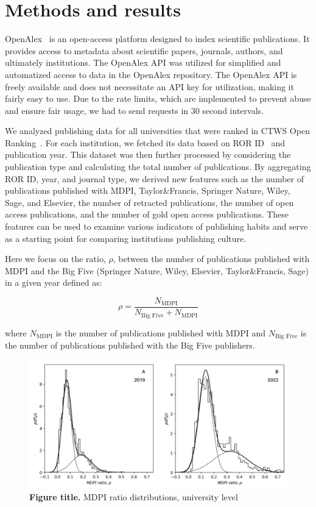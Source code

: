 \documentclass[amsfonts, amssymb, prl, superscriptaddress, notitlepage, twocolumn, nofootinbib]{revtex4-2}
\begin{document}
\section{Methods and results}
OpenAlex~\cite{priem2022openalex} is an open-access platform designed to index scientific publications. It provides access to metadata about scientific papers, journals, authors, and ultimately institutions. The OpenAlex API was utilized for simplified and automatized access to data in the OpenAlex repository. The OpenAlex API is freely available and does not necessitate an API key for utilization, making it fairly easy to use. Due to the rate limits, which are implemented to prevent abuse and ensure fair usage, we had to send requests in 30 second intervals. 

We analyzed publishing data for all universities that were ranked in CTWS Open Ranking~\cite{cwts2024leiden}. For each institution, we fetched its data based on ROR ID~\cite{ROR} and publication year. This dataset was then further processed by considering the publication type and calculating the total number of publications. By aggregating ROR ID, year, and journal type, we derived new features such as the number of publications published with MDPI, Taylor\&Francis, Springer Nature, Wiley, Sage, and Elsevier, the number of retracted publications, the number of open access publications, and the number of gold open access publications. These features can be used to examine various indicators of publishing habits and serve as a starting point for comparing institutions publishing culture. 

Here we focus on the ratio, $\rho$, between the number of publications published with MDPI and the Big Five (Springer Nature, Wiley, Elsevier, Taylor\&Francis, Sage) in a given year defined as: 

\begin{equation}
\rho = \frac{N_{\text{MDPI}}}{N_{\text{Big Five}}+N_{\text{MDPI}}}
\end{equation}

where $N_{\text{MDPI}}$ is the number of publications published with MDPI and $N_{\text{Big Five}}$ is the number of publications published with the Big Five publishers.

\begin{figure}
\centering
\includegraphics[width=1.0\linewidth]{Fig01.png}
\caption{\label{fig:fig1} {\bf Figure title.} MDPI ratio distributions, university level  
}
\end{figure}
\end{document}
